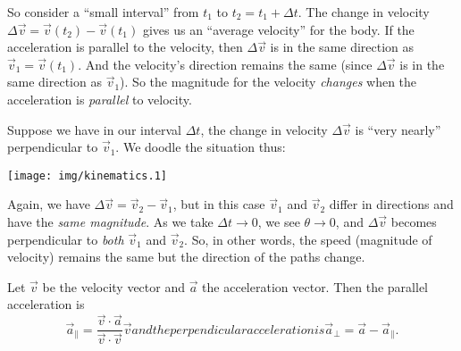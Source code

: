So consider a ``small interval'' from $t_{1}$ to $t_{2}=t_{1}+\Delta t$.
The change in velocity $\Delta\vec{v}=\vec{v}(t_{2})-\vec{v}(t_{1})$
gives us an ``average velocity'' for the body. If the acceleration is
parallel to the velocity, then $\Delta\vec{v}$ is in the same direction
as $\vec{v}_{1}=\vec{v}(t_{1})$. And the velocity's direction remains the same
(since $\Delta\vec{v}$ is in the same direction as $\vec{v}_{1}$). So
the magnitude for the velocity \emph{changes} when the acceleration is
\emph{parallel} to velocity.

\label{chunk:perpAcceleration}
Suppose we have in our interval $\Delta t$, the change in velocity
$\Delta\vec{v}$ is ``very nearly'' perpendicular to $\vec{v}_{1}$. We
doodle the situation thus:
\begin{center}
\texttt{[image: img/kinematics.1]}
\end{center}
\noindent%
Again, we have $\Delta\vec{v}=\vec{v}_{2}-\vec{v}_{1}$, but in this case
$\vec{v}_{1}$ and $\vec{v}_{2}$ differ in directions and have the
\emph{same magnitude}. As we take $\Delta t\to0$, we see $\theta\to0$,
and $\Delta\vec{v}$ becomes perpendicular to \emph{both} $\vec{v}_1$ and
$\vec{v}_2$. So, in other words, the speed (magnitude of velocity)
remains the same but the direction of the paths change.

\begin{thm}
Let $\vec{v}$ be the velocity vector and $\vec{a}$ the acceleration
vector. Then the parallel acceleration is
\begin{subequations}
\begin{equation}
  \vec{a}_{\parallel} = \frac{\vec{v}\cdot\vec{a}}{\vec{v}\cdot\vec{v}}\vec{v}
\end{equation}
and the perpendicular acceleration is
\begin{equation}
  \vec{a}_{\perp} = \vec{a} - \vec{a}_{\parallel}.
\end{equation}
\end{subequations}
\end{thm}

